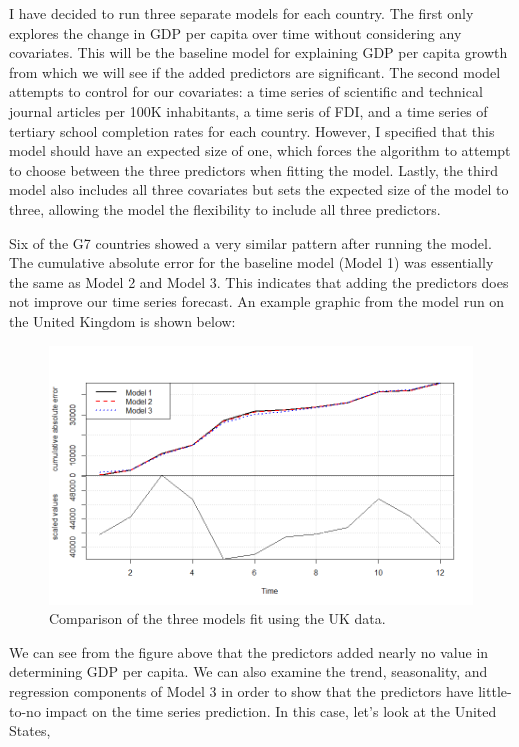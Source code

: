 \documentclass{article}
\begin{document}
I have decided to run three separate models for each country. The first only explores the change in GDP per capita over time without considering any covariates. This will be the baseline model for explaining GDP per capita growth from which we will see if the added predictors are significant. The second model attempts to control for our covariates: a time series of scientific and technical journal articles per 100K inhabitants, a time seris of FDI, and a time series of tertiary school completion rates for each country. However, I specified that this model should have an expected size of one, which forces the algorithm to attempt to choose between the three predictors when fitting the model. Lastly, the third model also includes all three covariates but sets the expected size of the model to three, allowing the model the flexibility to include all three predictors.

Six of the G7 countries showed a very similar pattern after running the model. The cumulative absolute error for the baseline model (Model 1) was essentially the same as Model 2 and Model 3. This indicates that adding the predictors does not improve our time series forecast. An example graphic from the model run on the United Kingdom is shown below:

\begin{figure}[H]
	\centering
	\includegraphics[width=\linewidth]{UK_Model.png}
	\caption{Comparison of the three models fit using the UK data.}
	\label{fig:pairs}
\end{figure}

We can see from the figure above that the predictors added nearly no value in determining GDP per capita. We can also examine the trend, seasonality, and regression components of Model 3 in order to show that the predictors have little-to-no impact on the time series prediction. In this case, let's look at the United States,
\end{document}

